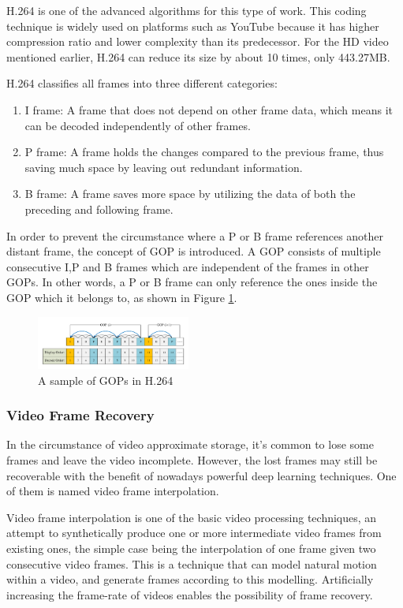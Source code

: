 \documentclass[sigconf]{acmart}
\begin{document}
H.264 is one of the advanced algorithms for this type of work. This coding technique is widely used on platforms such as YouTube because it has higher compression ratio and lower complexity than its predecessor. For the HD video mentioned earlier, H.264 can reduce its size by about 10 times, only 443.27MB.

H.264 classifies all frames into three different categories:
\begin{enumerate}
    \item I frame: A frame that does not depend on other frame data, which means it can be decoded independently of other frames.
    \item P frame: A frame holds the changes compared to the previous frame, thus saving much space by leaving out redundant information.
    \item B frame: A frame saves more space by utilizing the data of both the preceding and following frame.
\end{enumerate}
In order to prevent the circumstance where a P or B frame references another distant frame, the concept of GOP is introduced. A GOP consists of multiple consecutive I,P and B frames which are independent of the frames in other GOPs. In other words, a P or B frame can only reference the ones inside the GOP which it belongs to, as shown in Figure \ref{H264-IPB}.
\begin{figure}[ht]
\centering
\includegraphics[width=0.45\textwidth]{photo/H264_IPB.pdf}
\caption{A sample of GOPs in H.264}
\label{H264-IPB}
\end{figure}


\subsubsection{Video Frame Recovery}

In the circumstance of video approximate storage, it's common to lose some frames and leave the video incomplete. However, the lost frames may still be recoverable with the benefit of nowadays powerful deep learning techniques. One of them is named video frame interpolation.

Video frame interpolation is one of the basic video processing techniques, an attempt to synthetically produce one or more intermediate video frames from existing ones, the simple case being the interpolation of one frame given two consecutive video frames. This is a technique that can model natural motion within a video, and generate frames according to this modelling. Artificially increasing the frame-rate of videos enables the possibility of frame recovery.
\end{document}
